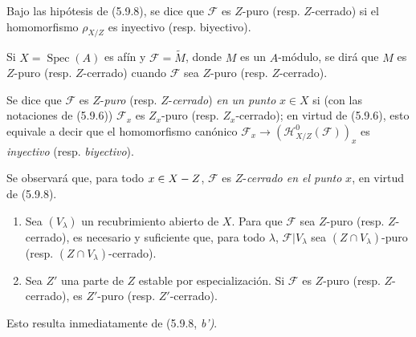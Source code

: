 \begin{definition}[5.9.9]
\label{IV.2.s5.9.9-fr}
Bajo las hipótesis de \textup{(5.9.8)}, se dice que $\mathcal F$ es $Z$-puro
(\textup{resp.} $Z$-cerrado) si el homomorfismo $\rho_{X/Z}$ es inyectivo
(\textup{resp.} biyectivo).
\end{definition}

Si $X=\operatorname{Spec}(A)$ es afín y $\mathcal F=\widetilde M$, donde $M$
es un $A$-módulo, se dirá que $M$ es $Z$-puro (resp. $Z$-cerrado) cuando
$\mathcal F$ sea $Z$-puro (resp. $Z$-cerrado).

Se dice que $\mathcal F$ es $Z$-\emph{puro} (resp. $Z$-\emph{cerrado}) \emph{en un punto}
$x\in X$ si (con las notaciones de (5.9.6)) $\mathcal F_x$ es
$Z_x$-puro (resp. $Z_x$-cerrado); en virtud de (5.9.6), esto equivale a decir
que el homomorfismo canónico
$\mathcal F_x\longrightarrow(\mathcal H^0_{X/Z}(\mathcal F))_x$
es \emph{inyectivo} (resp. \emph{biyectivo}).

Se observará que, para todo $x\in X- Z$, $\mathcal F$ es $Z$-\emph{cerrado en el punto}
$x$, en virtud de (5.9.8).

\begin{corollary}[5.9.10]
\label{IV.2.s5.9.10-fr}
\begin{enumerate}
\item[\textup{(i)}] Sea $(V_\lambda)$ un recubrimiento abierto de $X$. Para que
$\mathcal F$ sea $Z$-puro (\textup{resp.} $Z$-cerrado), es necesario y suficiente que,
para todo $\lambda$, $\mathcal F|V_\lambda$ sea
$(Z\cap V_\lambda)$-puro (\textup{resp.} $(Z\cap V_\lambda)$-cerrado).
\item[\textup{(ii)}] Sea $Z'$ una parte de $Z$ estable por especialización. Si
$\mathcal F$ es $Z$-puro (\textup{resp.} $Z$-cerrado), es $Z'$-puro
(\textup{resp.} $Z'$-cerrado).
\end{enumerate}
\end{corollary}

Esto resulta inmediatamente de (5.9.8, \emph{b')}.
